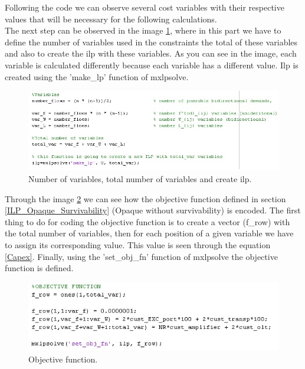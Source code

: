 \vspace{13pt}
Following the code we can observe several cost variables with their respective values that will be necessary for the following calculations.\\
The next step can be observed in the image \ref{second_step}, where in this part we have to define the number of variables used in the constraints the total of these variables and also to create the ilp with these variables. As you can see in the image, each variable is calculated differently because each variable has a different value. Ilp is created using the 'make\_lp' function of mxlpsolve.\\
\newpage
\begin{figure}[h!]
\centering
\includegraphics[width=\textwidth]{appendices/lpsolve/figures/second_step}
\caption{Number of variables, total number of variables and create ilp.}
\label{second_step}
\end{figure}

\vspace{13pt}
Through the image \ref{third_step} we can see how the objective function defined in section \ref{ILP_Opaque_Survivability} (Opaque without survivability) is encoded. The first thing to do for coding the objective function is to create a vector (f\_row) with the total number of variables, then for each position of a given variable we have to assign its corresponding value. This value is seen through the equation \ref{Capex}. Finally, using the 'set\_obj\_fn' function of mxlpsolve the objective function is defined.\\

\begin{figure}[h!]
\centering
\includegraphics[width=\textwidth]{appendices/lpsolve/figures/third_step}
\caption{Objective function.}
\label{third_step}
\end{figure}

